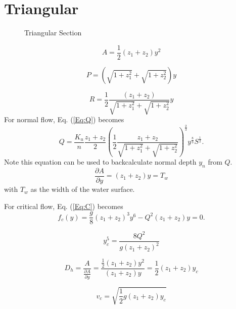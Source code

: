 \section{Triangular}

\begin{figure}[h]
\centering
{}
\caption{Triangular Section}
\end{figure}

\begin{equation}
A = \frac{1}{2} (z_1 + z_2) y^2
\end{equation}

\begin{equation}
P = \left(\sqrt{1+z_1^2} + \sqrt{1+z_2^2}\right)y
\end{equation}

\begin{equation}
R = \frac{1}{2}\frac{(z_1 + z_2) }{\sqrt{1+z_1^2} + \sqrt{1+z_2^2}}y
\end{equation}
For normal flow, Eq. (\ref{Eq:Q}) becomes
\begin{equation}
Q = \frac{K_u}{n} \frac{z_1 + z_2}{2}  \left(\frac{1}{2}\frac{z_1 + z_2}{\sqrt{1+z_1^2} + \sqrt{1+z_2^2}}\right)^{\frac{2}{3}} y^{\frac{8}{3}}S^{\frac{1}{2}}.
\end{equation}
Note this equation can be used to backcalculate normal depth $y_n$ from $Q$.
\begin{equation}
\frac{\partial A}{\partial y} = (z_1 + z_2)y = T_w
\end{equation}
with $T_w$ as the width of the water surface.

\noindent For critical flow, Eq. (\ref{Eq:C}) becomes
\begin{equation}  
f_c(y)= \frac{g}{8}(z_1 + z_2)^3y^6 - Q^2(z_1 + z_2)y = 0.
\end{equation}

\begin{equation}  
y_c^5 = \frac{8Q^2}{g(z_1 + z_2)^2}
\end{equation}

\begin{equation}  
D_h = \frac{A}{\frac{\partial A}{\partial y}} = \frac{\frac{1}{2} (z_1 + z_2) y^2}{(z_1 + z_2)y} = \frac{1}{2}(z_1 + z_2)y_c
\end{equation}

\begin{equation}  
v_c = \sqrt{\frac{1}{2}g(z_1 + z_2)y_c}
\end{equation}
